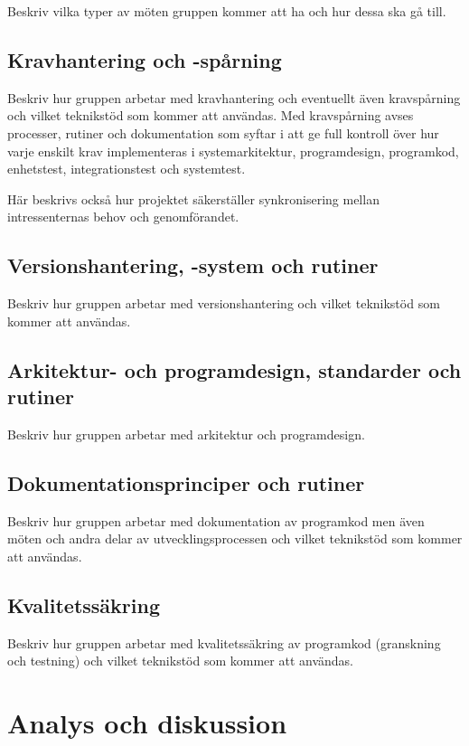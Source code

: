 \documentclass[a4paper,12pt,oneside,final]{extbook}
\begin{document}
Beskriv vilka typer av möten gruppen kommer att ha och hur dessa ska
gå till.

\section{Kravhantering och -spårning}

Beskriv hur gruppen arbetar med kravhantering och eventuellt även
kravspårning och vilket teknikstöd som kommer att användas. Med
kravspårning avses processer, rutiner och dokumentation som syftar i att
ge full kontroll över hur varje enskilt krav implementeras i
systemarkitektur, programdesign, programkod, enhetstest,
integrationstest och systemtest.

Här beskrivs också hur projektet säkerställer synkronisering mellan
intressenternas behov och genomförandet.

\section{Versionshantering, -system och rutiner}

Beskriv hur gruppen arbetar med versionshantering och vilket
teknikstöd som kommer att användas.

\section{Arkitektur- och programdesign, standarder och rutiner}

Beskriv hur gruppen arbetar med arkitektur och programdesign.

\section{Dokumentationsprinciper och rutiner}

Beskriv hur gruppen arbetar med dokumentation av programkod men även
möten och andra delar av utvecklingsprocessen och vilket teknikstöd
som kommer att användas.

\section{Kvalitetssäkring}

Beskriv hur gruppen arbetar med kvalitetssäkring av programkod
(granskning och testning) och vilket teknikstöd som kommer att
användas.

\chapter{Analys och diskussion}
\end{document}
